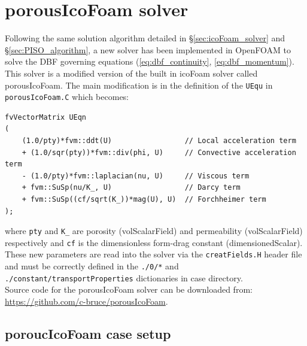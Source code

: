 \documentclass[a4paper,11pt]{report}
\begin{document}
\section{porousIcoFoam solver}
Following the same solution algorithm detailed in §\ref{sec:icoFoam_solver} and §\ref{sec:PISO_algorithm}, a new solver has been implemented in OpenFOAM to solve the DBF governing equations (\ref{eq:dbf_continuity}, \ref{eq:dbf_momentum}). This solver is a modified version of the built in icoFoam solver called porousIcoFoam. The main modification is in the definition of the \texttt{UEqu} in \texttt{porousIcoFoam.C} which becomes:
\begin{verbatim}
fvVectorMatrix UEqn
(
    (1.0/pty)*fvm::ddt(U)                 // Local acceleration term
    + (1.0/sqr(pty))*fvm::div(phi, U)     // Convective acceleration term
    - (1.0/pty)*fvm::laplacian(nu, U)     // Viscous term
    + fvm::SuSp(nu/K_, U)                 // Darcy term
    + fvm::SuSp((cf/sqrt(K_))*mag(U), U)  // Forchheimer term
);
\end{verbatim}
where \texttt{pty} and \texttt{K\_} are porosity (volScalarField) and permeability (volScalarField) respectively and \texttt{cf} is the dimensionless form-drag constant (dimensionedScalar). These new parameters are read into the solver via the \texttt{creatFields.H} header file and must be correctly defined in the \texttt{./0/*} and \texttt{./constant/transportProperties} dictionaries in case directory.
\vspace{5mm}\\
Source code for the porousIcoFoam solver can be downloaded from:\\\href{https://github.com/c-bruce/porousIcoFoam}{https://github.com/c-bruce/porousIcoFoam}.

\subsection{poroucIcoFoam case setup}
\end{document}

